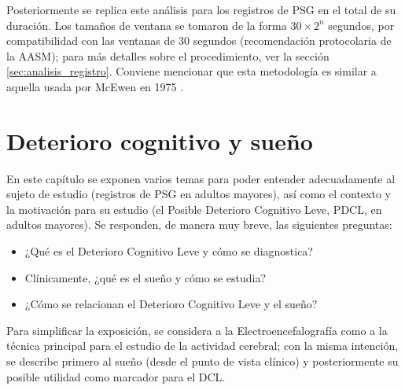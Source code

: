 \documentclass[12pt,letterpaper]{book}
\begin{document}
Posteriormente se replica este análisis para los registros de PSG en el total de su duración.
%
Los tamaños de ventana se tomaron de la forma $30 \times 2^{n}$ segundos, por compatibilidad con las ventanas de 30 segundos (recomendación protocolaria de la AASM); para más detalles sobre el procedimiento, ver la sección \ref{sec:analisis_registro}. 
%
Conviene mencionar que esta metodología es similar a aquella usada por McEwen en 1975 \cite{McEwen75}.



\chapter{Deterioro cognitivo y sueño}

En este capítulo se exponen varios temas para poder entender adecuadamente al sujeto de estudio (registros de PSG en adultos mayores), así como el contexto y la motivación para su estudio (el Posible Deterioro Cognitivo Leve, PDCL, en adultos mayores).
%
Se responden, de manera muy breve, las siguientes preguntas:
\begin{itemize}
\item ¿Qué es el Deterioro Cognitivo Leve y cómo se diagnostica?
\item Clínicamente, ¿qué es el sueño y cómo se estudia?
\item ¿Cómo se relacionan el Deterioro Cognitivo Leve y el sueño?
\end{itemize}

Para simplificar la exposición, se considera a la Electroencefalografía como a la técnica principal para el estudio de la actividad cerebral;
%
con la misma intención, se describe primero al sueño (desde el punto de vista clínico) y posteriormente su posible utilidad como marcador para el DCL.
\end{document}
